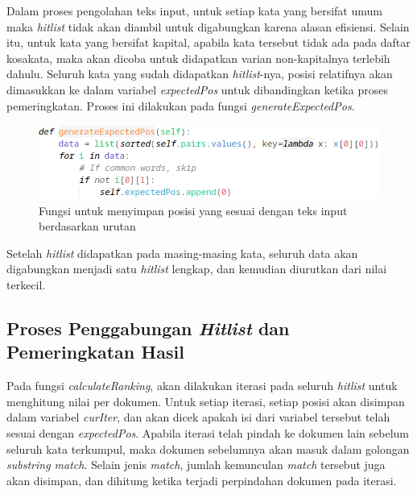 Dalam proses pengolahan teks input, untuk setiap kata yang bersifat umum maka 
\textit{hitlist} tidak akan diambil untuk digabungkan karena alasan efisiensi.
Selain itu, untuk kata yang bersifat kapital, apabila kata tersebut tidak ada 
pada daftar kosakata, maka akan dicoba untuk didapatkan varian non-kapitalnya 
terlebih dahulu. Seluruh kata yang sudah didapatkan \textit{hitlist}-nya, 
posisi relatifnya akan dimasukkan ke dalam variabel \textit{expectedPos} untuk 
dibandingkan ketika proses pemeringkatan. Proses ini dilakukan pada fungsi 
\textit{generateExpectedPos}.

\begin{figure}[H]
  \centering{}
	\includegraphics[width=\textwidth]{gambar/implementasi_generateexpectedpos}
  \caption{Fungsi untuk menyimpan posisi yang sesuai dengan teks input 
  berdasarkan urutan}
\end{figure}

Setelah \textit{hitlist} didapatkan pada masing-masing kata, seluruh data akan
digabungkan menjadi satu \textit{hitlist} lengkap, dan kemudian diurutkan dari 
nilai terkecil.

\subsection{Proses Penggabungan \textit{Hitlist} dan Pemeringkatan Hasil}

Pada fungsi \textit{calculateRanking}, akan dilakukan iterasi pada seluruh
\textit{hitlist} untuk menghitung nilai per dokumen. Untuk setiap iterasi,
setiap posisi akan disimpan dalam variabel \textit{curIter}, dan akan dicek 
apakah isi dari variabel tersebut telah sesuai dengan \textit{expectedPos}.
Apabila iterasi telah pindah ke dokumen lain sebelum seluruh kata terkumpul, 
maka dokumen sebelumnya akan masuk dalam golongan \textit{substring match}.
Selain jenis \textit{match}, jumlah kemunculan \textit{match} tersebut juga akan 
disimpan, dan dihitung ketika terjadi perpindahan dokumen pada iterasi.

